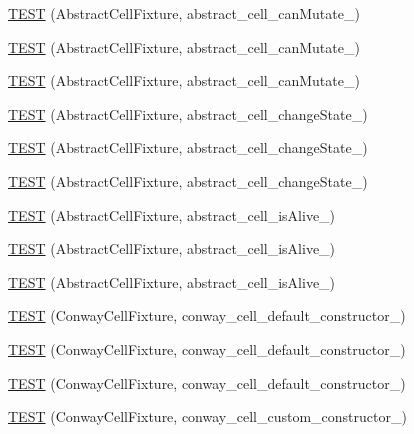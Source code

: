 \begin{DoxyCompactItemize}
\item 
\hyperlink{TestLife_8c_09_09_ab5a44d50c75c216949c67ebdc337020a}{T\-E\-S\-T} (Abstract\-Cell\-Fixture, abstract\-\_\-cell\-\_\-can\-Mutate\-\_)
\item 
\hyperlink{TestLife_8c_09_09_a966b2cb59e53ae074d48f1ecc72ee0d9}{T\-E\-S\-T} (Abstract\-Cell\-Fixture, abstract\-\_\-cell\-\_\-can\-Mutate\-\_)
\item 
\hyperlink{TestLife_8c_09_09_a968aec6ca187d1bee8488988c92c6458}{T\-E\-S\-T} (Abstract\-Cell\-Fixture, abstract\-\_\-cell\-\_\-can\-Mutate\-\_)
\item 
\hyperlink{TestLife_8c_09_09_a4778ce2d8eedc94f57d606df25b8925c}{T\-E\-S\-T} (Abstract\-Cell\-Fixture, abstract\-\_\-cell\-\_\-change\-State\-\_)
\item 
\hyperlink{TestLife_8c_09_09_a65c4a9eac62b7f18124415429fd46149}{T\-E\-S\-T} (Abstract\-Cell\-Fixture, abstract\-\_\-cell\-\_\-change\-State\-\_)
\item 
\hyperlink{TestLife_8c_09_09_a942687f4d40953798ee276d728b4fafc}{T\-E\-S\-T} (Abstract\-Cell\-Fixture, abstract\-\_\-cell\-\_\-change\-State\-\_)
\item 
\hyperlink{TestLife_8c_09_09_a4059eb29bfc3a4d73328c13750a61fc5}{T\-E\-S\-T} (Abstract\-Cell\-Fixture, abstract\-\_\-cell\-\_\-is\-Alive\-\_)
\item 
\hyperlink{TestLife_8c_09_09_a6ad979593e6b116542dda687f8f42e12}{T\-E\-S\-T} (Abstract\-Cell\-Fixture, abstract\-\_\-cell\-\_\-is\-Alive\-\_)
\item 
\hyperlink{TestLife_8c_09_09_a003eec48faf2d762aaac4e5d59cee0a4}{T\-E\-S\-T} (Abstract\-Cell\-Fixture, abstract\-\_\-cell\-\_\-is\-Alive\-\_)
\item 
\hyperlink{TestLife_8c_09_09_ae05a09392d273da0ad2e5dd1b4f390c8}{T\-E\-S\-T} (Conway\-Cell\-Fixture, conway\-\_\-cell\-\_\-default\-\_\-constructor\-\_)
\item 
\hyperlink{TestLife_8c_09_09_af325567419308e8272dd009bc6681351}{T\-E\-S\-T} (Conway\-Cell\-Fixture, conway\-\_\-cell\-\_\-default\-\_\-constructor\-\_)
\item 
\hyperlink{TestLife_8c_09_09_ad54811c8d0ace242c232ade1c8d03ddc}{T\-E\-S\-T} (Conway\-Cell\-Fixture, conway\-\_\-cell\-\_\-default\-\_\-constructor\-\_)
\item 
\hyperlink{TestLife_8c_09_09_ab66e7ee0054b4aca74d5f96132449172}{T\-E\-S\-T} (Conway\-Cell\-Fixture, conway\-\_\-cell\-\_\-custom\-\_\-constructor\-\_)

\end{DoxyCompactItemize}
